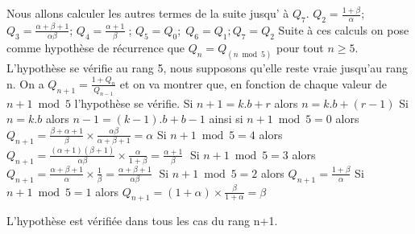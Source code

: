 \documentclass[9pt]{amsart}
\begin{document}
Nous allons calculer les autres termes de la suite jusqu' \`{a} $Q_{7}$.\newline
$Q_{2} = \frac{1+\beta}{\alpha}$;\; $Q_{3} = \frac{\alpha+\beta+1}{\alpha\beta}$;\; $Q_{4}=\frac{\alpha+1}{\beta}\;$; $Q_{5}= Q_{0};\; Q_{6} = Q_{1}; Q_{7} = Q_{2}$ 
\newline\newline Suite \`{a} ces calculs on pose comme hypoth\`{e}se de r\'{e}currence que $Q_{n} = Q_{(n\bmod5)}$ pour tout $n \geq 5$. L'hypoth\`{e}se se v\'{e}rifie au rang 5, nous supposons qu'elle reste vraie jusqu'au rang n. On a $Q_{n+1} = \frac{1 + Q_{n}}{Q_{n-1}}$ et on va montrer que, en fonction de chaque valeur de $n+1\bmod5$ l'hypoth\`{e}se se v\'{e}rifie. \newline\newline
Si $n+1 = k.b + r$ alors $n = k.b + (r-1)$ \newline
Si $n = k.b$ alors $n-1 = (k-1).b + b - 1$\newline
ainsi si $n+1 \bmod 5 = 0$ alors $Q_{n+1} = \frac{\beta+\alpha+1}{\beta}\times\frac{\alpha\beta}{\alpha+\beta+1} = \alpha$\newline
Si $n+1 \bmod 5 = 4$ alors $Q_{n+1} = \frac{(\alpha+1)(\beta+1)}{\alpha\beta}\times\frac{\alpha}{1 + \beta} = \frac{\alpha+1}{\beta}\;$\newline
Si $n+1 \bmod 5 = 3$ alors  $Q_{n+1} = \frac{\alpha+\beta+1}{\alpha}\times\frac{1}{\beta} = \frac{\alpha+\beta+1}{\alpha\beta}\;$\newline
Si $n+1 \bmod 5 = 2$ alors  $Q_{n+1} = \frac{1+\beta}{\alpha}$\newline
Si $n+1 \bmod 5 = 1$ alors  $Q_{n+1} = (1 + \alpha)\times\frac{\beta}{1+\alpha} = \beta$\newline\newline

L'hypothèse est vérifiée dans tous les cas du rang n+1.
\end{document}
